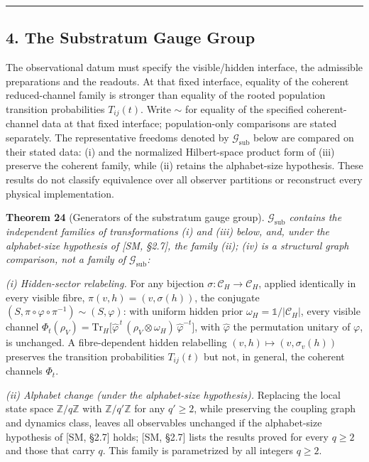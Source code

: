 \documentclass[
]{article}
\begin{document}
\begin{center}\rule{0.5\linewidth}{0.5pt}\end{center}

\hypertarget{the-substratum-gauge-group}{%
\subsection{4. The Substratum Gauge
Group}\label{the-substratum-gauge-group}}

The observational datum must specify the visible/hidden interface, the
admissible preparations and the readouts. At that fixed interface,
equality of the coherent reduced-channel family is stronger than
equality of the rooted population transition probabilities
\(T_{ij}(t)\). Write \(\sim\) for equality of the specified
coherent-channel data at that fixed interface; population-only
comparisons are stated separately. The representative freedoms denoted
by \(\mathcal{G}_{\text{sub}}\) below are compared on their stated data:
(i) and the normalized Hilbert-space product form of (iii) preserve the
coherent family, while (ii) retains the alphabet-size hypothesis. These
results do not classify equivalence over all observer partitions or
reconstruct every physical implementation.

\textbf{Theorem 24} (Generators of the substratum gauge group).
\emph{\(\mathcal{G}_{\text{sub}}\) contains the independent families of
transformations (i) and (iii) below, and, under the alphabet-size
hypothesis of {[}SM, §2.7{]}, the family (ii); (iv) is a structural
graph comparison, not a family of \(\mathcal{G}_{\text{sub}}\):}

\emph{(i) Hidden-sector relabeling.} For any bijection
\(\sigma: \mathcal{C}_H \to \mathcal{C}_H\), applied identically in
every visible fibre, \(\pi(v,h) = (v, \sigma(h))\), the conjugate
\((S, \pi \circ \varphi \circ \pi^{-1}) \sim (S, \varphi)\): with
uniform hidden prior \(\omega_H = \mathbb{1}/|\mathcal{C}_H|\), every
visible channel
\(\Phi_t(\rho_V) = \mathrm{Tr}_H\big[\hat\varphi^{\,t}\,(\rho_V \otimes \omega_H)\,\hat\varphi^{-t}\big]\),
with \(\hat\varphi\) the permutation unitary of \(\varphi\), is
unchanged. A fibre-dependent hidden relabelling
\((v,h) \mapsto (v, \sigma_v(h))\) preserves the transition
probabilities \(T_{ij}(t)\) but not, in general, the coherent channels
\(\Phi_t\).

\emph{(ii) Alphabet change (under the alphabet-size hypothesis).}
Replacing the local state space \(\mathbb{Z}/q\mathbb{Z}\) with
\(\mathbb{Z}/q'\mathbb{Z}\) for any \(q' \geq 2\), while preserving the
coupling graph and dynamics class, leaves all observables unchanged if
the alphabet-size hypothesis of {[}SM, §2.7{]} holds; {[}SM, §2.7{]}
lists the results proved for every \(q \geq 2\) and those that carry
\(q\). This family is parametrized by all integers \(q \geq 2\).
\end{document}

